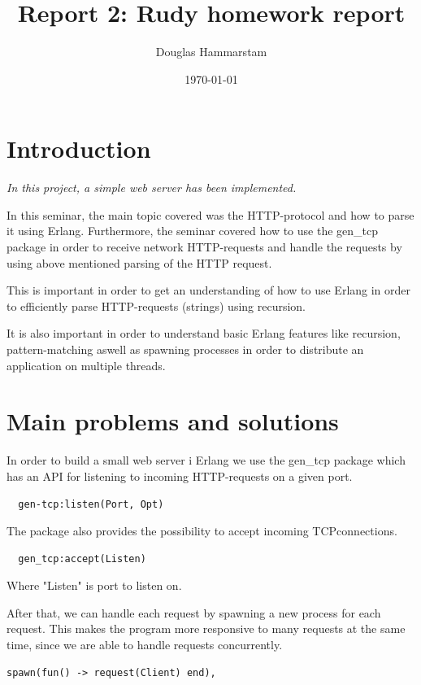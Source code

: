 \documentclass[a4paper, 11pt]{article}
\title{Report 2: Rudy homework report}
\author{Douglas Hammarstam}
\date{\today{}}
\begin{document}
\maketitle

\section{Introduction}

\textit{In this project, a simple web server has been implemented.}

In this seminar, the main topic covered was the HTTP-protocol and how to parse it using Erlang.
Furthermore, the seminar covered how to use the gen\_tcp
package in order to receive network HTTP-requests and handle the requests by
using above mentioned parsing of the HTTP request.  

This is important in order to get an understanding of how to use Erlang in order 
to efficiently parse HTTP-requests (strings)
using recursion.

It is also important in order to understand basic Erlang features like recursion,
pattern-matching aswell as spawning processes in order to distribute an application on multiple threads.

\section{Main problems and solutions}


In order to build a small web server i Erlang we use the gen\_tcp package which 
has an API for listening to incoming HTTP-requests on a given port.

\begin{verbatim}
  gen-tcp:listen(Port, Opt)
\end{verbatim}

The package also provides the possibility to accept incoming TCP\-connections.

\begin{verbatim}
  gen_tcp:accept(Listen)
\end{verbatim}

Where "Listen" is port to listen on.

After that, we can handle each request by spawning a new process for each request. This makes the program more responsive to many requests at the same time, since we are able to handle requests concurrently.


\begin{verbatim}
spawn(fun() -> request(Client) end),
\end{verbatim}
\end{document}
